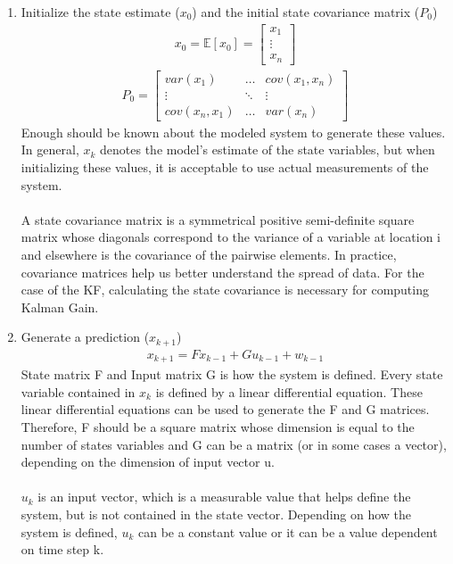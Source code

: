 \begin{enumerate}
  \item Initialize the state estimate ($x_0$) and the initial state covariance matrix ($P_0$) 
    \begin{align*}
        x_0 = \mathbb{E}[x_0]  = \begin{bmatrix}
           x_1 \\
           \vdots \\
           x_n 
         \end{bmatrix} 
    \end{align*}
  \begin{align*}
      P_0 =
      \begin{bmatrix}
           var(x_1)  & \hdots & cov(x_1,x_n) \\
           \vdots & \ddots & \vdots \\
           cov(x_n, x_1)  & \hdots & var(x_n )
         \end{bmatrix} 
  \end{align*}
  Enough should be known about the modeled system to generate these values. In general, $x_k$ denotes the model's estimate of the state variables, but when initializing these values, it is acceptable to use actual measurements of the system. \\ \\
   A state covariance matrix is a symmetrical positive semi-definite square matrix whose diagonals correspond to the variance of a variable at location i and elsewhere is the covariance of the pairwise elements. In practice, covariance matrices help us better understand the spread of data. For the case of the KF, calculating the state covariance is necessary for computing Kalman Gain. 
  \item Generate a prediction ($x_{k+1}$)
  \begin{align*}
      x_{k+1} = F x_{k-1} +  G u_{k-1} + w_{k-1} 
  \end{align*} 
  State matrix F and Input matrix G is how the system is defined. Every state variable contained in $x_k$ is defined by a linear differential equation. These linear differential equations can be used to generate the F and G matrices. Therefore, F should be a square matrix whose dimension is equal to the number of states variables and G can be a matrix (or in some cases a vector), depending on the dimension of input vector u. \\ \\
  $u_k$  is an input vector, which is a measurable value that helps define the system, but is not contained in the state vector. Depending on how the system is defined, $u_k$  can be a constant value or it can be a value dependent on time step k. \\ \\

\end{enumerate}
